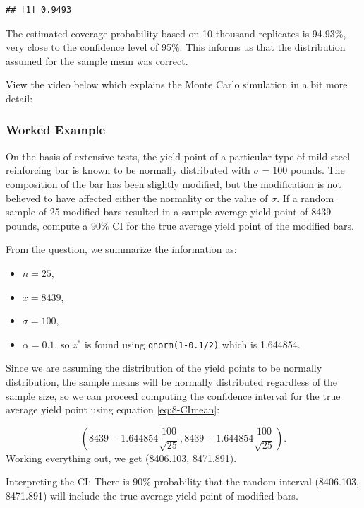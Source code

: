 \documentclass[
]{book}
\providecommand{\tightlist}{%
  \setlength{\itemsep}{0pt}\setlength{\parskip}{0pt}}
\begin{document}
\begin{verbatim}
## [1] 0.9493
\end{verbatim}

The estimated coverage probability based on 10 thousand replicates is 94.93\%, very close to the confidence level of 95\%. This informs us that the distribution assumed for the sample mean was correct.

View the video below which explains the Monte Carlo simulation in a bit more detail:

\subsubsection{Worked Example}\label{worked-example-1}

On the basis of extensive tests, the yield point of a particular type of mild steel reinforcing bar is known to be normally distributed with \(\sigma=100\) pounds. The composition of the bar has been slightly modified, but the modification is not believed to have affected either the normality or the value of \(\sigma\). If a random sample of 25 modified bars resulted in a sample average yield point of 8439 pounds, compute a 90\% CI for the true average yield point of the modified bars.

From the question, we summarize the information as:

\begin{itemize}
\tightlist
\item
  \(n = 25\),
\item
  \(\bar{x} = 8439\),
\item
  \(\sigma = 100\),
\item
  \(\alpha = 0.1\), so \(z^*\) is found using \texttt{qnorm(1-0.1/2)} which is 1.644854.
\end{itemize}

Since we are assuming the distribution of the yield points to be normally distribution, the sample means will be normally distributed regardless of the sample size, so we can proceed computing the confidence interval for the true average yield point using equation \eqref{eq:8-CImean}:

\[
\left( 8439 - 1.644854 \frac{100}{\sqrt{25}} , 8439 + 1.644854 \frac{100}{\sqrt{25}} \right).
\]
Working everything out, we get (8406.103, 8471.891).

Interpreting the CI: There is 90\% probability that the random interval (8406.103, 8471.891) will include the true average yield point of modified bars.
\end{document}

